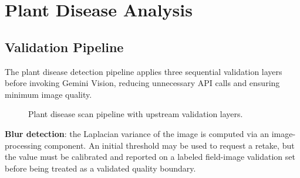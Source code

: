 \documentclass[conference]{IEEEtran}
\begin{document}
\section{Plant Disease Analysis}

\subsection{Validation Pipeline}

The plant disease detection pipeline applies three sequential validation layers before invoking Gemini Vision, reducing unnecessary API calls and ensuring minimum image quality.

\begin{figure}[htbp]
\centering
{}
\caption{Plant disease scan pipeline with upstream validation layers.}
\label{fig:scan}
\end{figure}

\textbf{Blur detection}: the Laplacian variance of the image is computed via an image-processing component. An initial threshold may be used to request a retake, but the value must be calibrated and reported on a labeled field-image validation set before being treated as a validated quality boundary.
\end{document}
